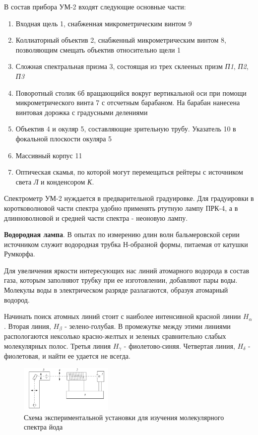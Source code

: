 \documentclass{article}
\begin{document}
В состав прибора УМ-2 входят следующие основные части:
\begin{enumerate}
    \item Входная щель 1, снабженная микрометрическим винтом 9
    \item Коллиаторный объектив 2, снабженный микрометрическим винтом 8, позволяющим смещать объектив относительно щели 1
    \item Сложная спектральная призма 3, состоящая из трех склееных призм \textsl{П1}, \textsl{П2}, \textsl{П3}
    \item Поворотный столик 6б вращающийся вокруг вертикальной оси при помощи микрометрического винта 7 с отсчетным барабаном. На барабан нанесена винтовая дорожка с градусными делениями
    \item Объектив 4 и окуляр 5, составляющие зрительную трубу. Указатель 10 в фокальной плоскости окуляра 5
    \item Массивный корпус 11
    \item Оптическая скамья, по которой могут перемещаться рейтеры с источником света \textsl{Л} и конденсором \textsl{К}.
\end{enumerate}

Спектрометр УМ-2 нуждается в предварительной градуировке. Для градуировки в коротковолновой части спектра удобно применять ртутную лампу ПРК-4, а в длинноволновой и средней части спектра - неоновую лампу. 

\textbf{Водородная лампа}. В опытах по измерению длин волн бальмеровской серии источником служит водородная трубка Н-образной формы, питаемая от катушки Румкорфа. 

Для увеличения яркости интересующих нас линий атомарного водорода в состав газа, которым заполняют трубку при ее изготовлении, добавляют пары воды. Молекулы воды в электрическом разряде разлагаются, образуя атомарный водород. 

Начинать поиск атомных линий стоит с наиболее интенсивной красной линии $H_{\alpha}$. Вторая линия, $H_{\beta}$ - зелено-голубая. В промежутке между этими линиями распологаются нексолько красно-желтых и зеленых сравнительно слабых молекулярных полос. Третья линия $H_{\gamma}$ - фиолетово-синяя. Четвертая линия, 
$H_{\delta}$ - фиолетовая, и найти ее удается не всегда.


\begin{figure} 

  \centering
    \includegraphics[width=0.4\textwidth]{Screenshot 2023-10-07 at 2.44.47 PM.png}    

  \caption{Схема экспериментальной установки для изучения молекулярного спектра йода}

  \label{UM-2 2}
\end{figure}
\end{document}

